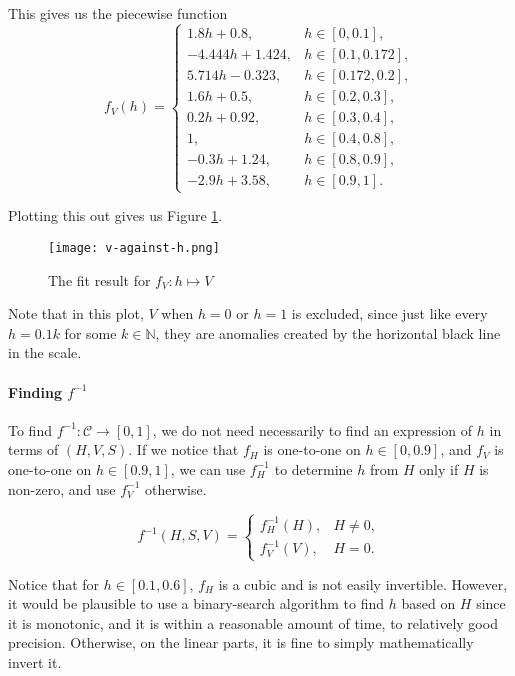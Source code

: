This gives us the piecewise function
\[
    f_V(h) = \begin{cases}
        1.8h + 0.8,      & h \in [0, 0.1],     \\
        -4.444h + 1.424, & h \in [0.1, 0.172], \\
        5.714h - 0.323,  & h \in [0.172, 0.2], \\
        1.6h + 0.5,      & h \in [0.2, 0.3],   \\
        0.2h + 0.92,     & h \in [0.3, 0.4],   \\
        1,               & h \in [0.4, 0.8],   \\
        -0.3h + 1.24,    & h \in [0.8, 0.9],   \\
        -2.9h + 3.58,    & h \in [0.9, 1].
    \end{cases}
\]

Plotting this out gives us Figure \ref{fig:v-against-h}.

\begin{figure}[htp]
    \centering
    \texttt{[image: v-against-h.png]}
    \caption{The fit result for \(f_V: h \mapsto V\)}
    \label{fig:v-against-h}
\end{figure}

Note that in this plot, \(V\) when \(h = 0\) or \(h = 1\) is excluded, since just like every \(h = 0.1 k\) for some \(k \in \mathbb{N}\), they are anomalies created by the horizontal black line in the scale.

\paragraph{Finding \(f^{-1}\)}

To find \(f^{-1}: \mathcal{C} \to [0, 1]\), we do not need necessarily to find an expression of \(h\) in terms of \((H, V, S)\). If we notice that \(f_H\) is one-to-one on \(h \in [0, 0.9]\), and \(f_V\) is one-to-one on \(h \in [0.9, 1]\), we can use \(f_H^{-1}\) to determine \(h\) from \(H\) only if \(H\) is non-zero, and use \(f_V^{-1}\) otherwise.

\[
    f^{-1}(H, S, V) = \begin{cases}
        f_H^{-1}(H), & H \neq 0, \\
        f_V^{-1}(V), & H = 0.
    \end{cases}
\]

Notice that for \(h \in [0.1, 0.6]\), \(f_H\) is a cubic and is not easily invertible. However, it would be plausible to use a binary-search algorithm to find \(h\) based on \(H\) since it is monotonic, and it is within a reasonable amount of time, to relatively good precision. Otherwise, on the linear parts, it is fine to simply mathematically invert it.

